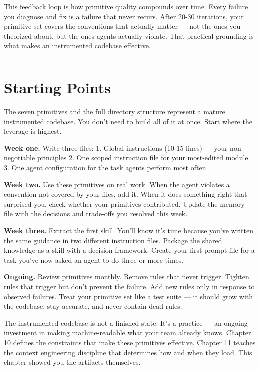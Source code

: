 \documentclass[
  a4paper,
  DIV=11,
  numbers=noendperiod]{scrreprt}
\begin{document}
This feedback loop is how primitive quality compounds over time. Every
failure you diagnose and fix is a failure that never recurs. After 20-30
iterations, your primitive set covers the conventions that actually
matter --- not the ones you theorized about, but the ones agents
actually violate. That practical grounding is what makes an instrumented
codebase effective.

\begin{center}\rule{0.5\linewidth}{0.5pt}\end{center}

\section{Starting Points}\label{starting-points}

The seven primitives and the full directory structure represent a mature
instrumented codebase. You don't need to build all of it at once. Start
where the leverage is highest.

\textbf{Week one.} Write three files: 1. Global instructions (10-15
lines) --- your non-negotiable principles 2. One scoped instruction file
for your most-edited module 3. One agent configuration for the task
agents perform most often

\textbf{Week two.} Use these primitives on real work. When the agent
violates a convention not covered by your files, add it. When it does
something right that surprised you, check whether your primitives
contributed. Update the memory file with the decisions and trade-offs
you resolved this week.

\textbf{Week three.} Extract the first skill. You'll know it's time
because you've written the same guidance in two different instruction
files. Package the shared knowledge as a skill with a decision
framework. Create your first prompt file for a task you've now asked an
agent to do three or more times.

\textbf{Ongoing.} Review primitives monthly. Remove rules that never
trigger. Tighten rules that trigger but don't prevent the failure. Add
new rules only in response to observed failures. Treat your primitive
set like a test suite --- it should grow with the codebase, stay
accurate, and never contain dead rules.

The instrumented codebase is not a finished state. It's a practice ---
an ongoing investment in making machine-readable what your team already
knows. Chapter 10 defines the constraints that make these primitives
effective. Chapter 11 teaches the context engineering discipline that
determines how and when they load. This chapter showed you the artifacts
themselves.
\end{document}
